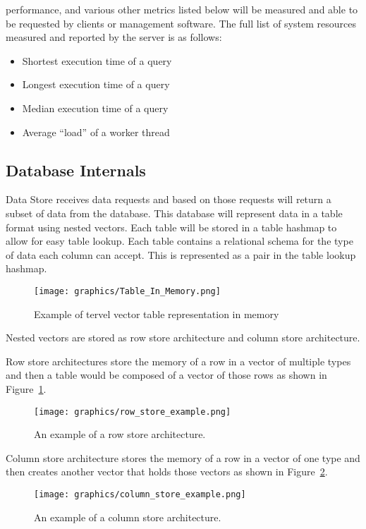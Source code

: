 \documentclass[letterpaper, 12pt]{article}
\begin{document}
performance, and various other metrics listed below will be measured and able to be
requested by clients or management software. The full list of system resources measured
and reported by the server is as follows:
\begin{itemize}
 \item Shortest execution time of a query
 \item Longest execution time of a query
 \item Median execution time of a query
 \item Average ``load'' of a worker thread
\end{itemize}
\par\vspace{\baselineskip}

\subsection{Database Internals}
Data Store receives data requests and based on those requests will return a subset of data from
the database. This database will represent data in a table format using nested vectors. Each table
will be stored in a table hashmap to allow for easy table lookup. Each table contains a relational
schema for the type of data each column can accept. This is represented as a pair in the table
lookup hashmap.

\begin{figure}
  \centering
  \texttt{[image: graphics/Table\_In\_Memory.png]}
  \caption{Example of tervel vector table representation in memory}
\end{figure}

Nested vectors are stored as row store architecture and column store architecture.

Row store architectures store the memory of a row in a vector of multiple types and then
a table would be composed of a vector of those rows as shown in Figure~\ref{fig:row_store_ex}.
\begin{figure}
  \centering
  \texttt{[image: graphics/row\_store\_example.png]}
  \cite{rowstore}
  \label{fig:row_store_ex}
  \caption{An example of a row store architecture.}
\end{figure}

Column store architecture stores the memory of a row in a vector of one type and then 
creates another vector that holds those vectors as shown in Figure~\ref{fig:column_store_ex}.
\begin{figure}
  \centering
  \texttt{[image: graphics/column\_store\_example.png]}
  \cite{rowstore}
  \label{fig:column_store_ex}
  \caption{An example of a column store architecture.}
\end{figure}
\end{document}
